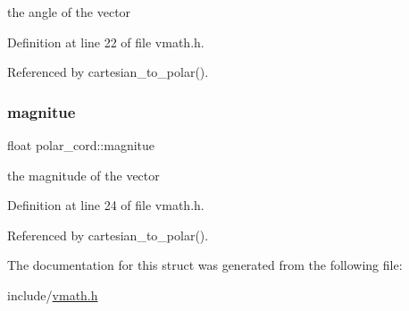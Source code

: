 the angle of the vector 

Definition at line 22 of file vmath.\+h.



Referenced by cartesian\+\_\+to\+\_\+polar().

\mbox{\label{structpolar__cord_aec2e25fecc82af176f0fcd23f1e02f0c}} 
\subsubsection{\texorpdfstring{magnitue}{magnitue}}
{\footnotesize\ttfamily float polar\+\_\+cord\+::magnitue}

the magnitude of the vector 

Definition at line 24 of file vmath.\+h.



Referenced by cartesian\+\_\+to\+\_\+polar().



The documentation for this struct was generated from the following file\+:\begin{DoxyCompactItemize}
\item 
include/\hyperlink{vmath_8h}{vmath.\+h}\end{DoxyCompactItemize}
